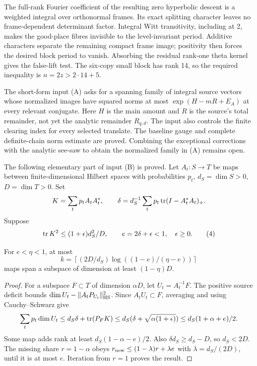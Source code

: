 The full-rank Fourier coefficient of the resulting zero hyperbolic
descent is a weighted integral over orthonormal frames. Its exact
splitting character leaves no frame-dependent determinant factor.
Integral Witt transitivity, including at 2, makes the good-place
fibres invisible to the level-invariant period. Additive characters
separate the remaining compact frame image; positivity then forces
the desired block period to vanish. Absorbing the residual rank-one
theta kernel gives the false-lift test. The six-copy small block has
rank 14, so the required inequality is \(n=2z>2\cdot14+5\).

The short-form input (A) asks for a spanning family of integral
source vectors whose normalized images have squared norms at
most \(\exp(H-mR+E_A)\) at every relevant conjugate. Here \(H\)
is the main amount and \(R\) is the source's total remainder,
not yet the analytic remainder \(R_{q,d}\). The input also
controls the finite clearing index for every selected translate.
The baseline gauge and complete definite-chain norm estimate are
proved. Combining the exceptional corrections with the analytic
see-saw to obtain the normalized family in (A) remains open.

The following elementary part of input (B) is proved. Let
\(A_t:S\to T\) be maps between finite-dimensional Hilbert spaces
with probabilities \(p_t\), \(d_S=\dim S>0\), \(D=\dim T>0\).
Set
\[
 K=\sum_t p_t A_tA_t^*,\qquad
 \delta=d_S^{-1}\sum_t p_t\operatorname{tr}(I-A_t^*A_t)_+.
\]
Suppose
\[
 \operatorname{tr} K^2\le (1+\epsilon)d_S^2/D,\qquad
 e=2\delta+\epsilon<1,\quad \epsilon\ge0.
 \tag{4}
\]
\begin{proposition}
For \(e<\eta<1\), at most
\[
 k=\left\lceil (2D/d_S)\log((1-e)/(\eta-e))\right\rceil
\]
maps span a subspace of dimension at least \((1-\eta)D\).
\end{proposition}
\begin{proof}
For a subspace \(F\subset T\) of dimension \(\alpha D\), let
\(U_t=A_t^{-1}F\). The positive source deficit bounds
\(\dim U_t-\|A_tP_{U_t}\|_{\rm HS}^2\).
Since \(A_tU_t\subset F\), averaging and using Cauchy--Schwarz
give
\[
 \sum_t p_t\dim U_t
 \le d_S\delta+\operatorname{tr}(P_FK)
 \le d_S(\delta+\sqrt{\alpha(1+\epsilon)})
 \le d_S(1+\alpha+e)/2.
\]
Some map adds rank at least \(d_S(1-\alpha-e)/2\).
Also \(\delta d_S\ge d_S-D\), so \(d_S<2D\).
The missing share \(r=1-\alpha\) obeys
\(r_{\rm new}\le (1-\lambda)r+\lambda e\) with
\(\lambda=d_S/(2D)\), until it is at most \(e\).
Iteration from \(r=1\) proves the result.
\end{proof}

